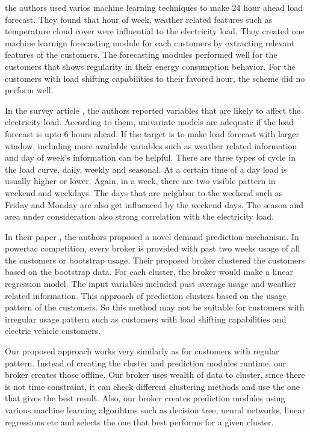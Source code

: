 \cite{parra2013initial} the authors used varios machine learning techniques to make 24 hour ahead load forecast. They found that hour of week, weather related features such as temperature cloud cover were influential to the electricity load. They created one machine learnign forecasting module for each customers by extracting relevant features of the customers. The forecasting modules performed well for the customers that shows regularity in their energy consumption behavior. For the customers with load shifting capabilities to their favored hour, the scheme did no perform well.

In the survey article \cite{hahn2009electric}, the authors reported variables that are likely to affect the electricity load. According to them, univariate models are adequate if the load forecast is upto 6 hours ahead. If the target is to make load forecast with larger window, including more available variables such as weather related information and day of week's information can be helpful. There are three types of cycle in the load curve, daily, weekly and seasonal. At a certain time of a day load is usually higher or lower. Again, in a week, there are two visible pattern in weekend and weekdays. The days that are neighbor to the weekend such as Friday and Monday are also get influenced by the weekend days. The season and area under consideration also strong correlation with the electricity load.

In their paper \cite{wang2015gongbroker}, the authors proposed a novel demand prediction mechanism. In powertac competition, every broker is provided with past two weeks usage of all the customers or bootstrap usage. Their proposed broker clustered the customers based on the bootstrap data. For each cluster, the broker would make a linear regression model. The input variables included past average usage and weather related information. This approach of prediction clusters based on the usage pattern of the customers. So this method may not be suitable for customers with irregular usage pattern such as customers with load shifting capabilities and electric vehicle customers.

Our proposed approach works very similarly as \cite{wang2015gongbroker} for customers with regular pattern. Instead of creating the cluster and prediction modules runtime, our broker creates those offline. Our broker uses wealth of data to cluster, since there is not time constraint, it can check different clustering methods and use the one that gives the best result. Also, our broker creates prediction modules using various machine learning algorihtms such as decision tree, neural networks, linear regressions etc and selects the one that best performs for a given cluster.


